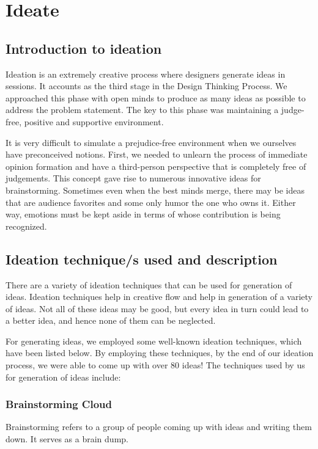 \pagestyle{fancy}
\thispagestyle{fancy}
\chapter{Ideate}
\section{Introduction to ideation}

Ideation is an extremely creative process where designers generate ideas in sessions. It accounts as the third stage in the Design Thinking Process. We approached this phase with open minds to produce as many ideas as possible to address the problem statement. The key to this phase was maintaining a judge-free, positive and supportive environment.

It is very difficult to simulate a prejudice-free environment when we ourselves have preconceived notions. First, we needed to unlearn the process of immediate opinion formation and have a third-person perspective that is completely free of judgements. This concept gave rise to numerous innovative ideas for brainstorming. Sometimes even when the best minds merge, there may be ideas that are audience favorites and some only humor the one who owns it. Either way, emotions must be kept aside in terms of whose contribution is being recognized.

\section{Ideation technique/s used and description}

There are a variety of ideation techniques that can be used for generation of ideas. Ideation techniques help in creative flow and help in generation of a variety of ideas. Not all of these ideas may be good, but every idea in turn could lead to a better idea, and hence none of them can be neglected.

For generating ideas, we employed some well-known ideation techniques, which have been listed below. By employing these techniques, by the end of our ideation process, we were able to come up with over 80 ideas! The techniques used by us for generation of ideas include:

\subsection{Brainstorming Cloud}
Brainstorming refers to a group of people coming up with ideas and writing them down. It serves as a brain dump.

